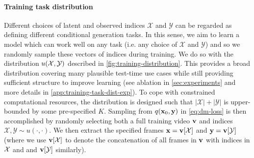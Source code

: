 \paragraph{Training task distribution}
Different choices of latent and observed indices $\mathcal{X}$ and $\mathcal{Y}$ can be regarded as defining different conditional generation tasks. In this sense, we aim to learn a model which can work well on any task (i.e. any choice of $\mathcal{X}$ and $\mathcal{Y}$) and so we randomly sample these vectors of indices during training. We do so with the distribution $u(\mathcal{X},\mathcal{Y})$ described in \cref{fig:training-distribution}. This provides a broad distribution covering many plausible test-time use cases while still providing sufficient structure to improve learning (see ablation in \cref{sec:experiments} and more details in \cref{app:training-task-dist-exp}). To cope with constrained computational resources, the distribution is designed such that $|\mathcal{X}|+|\mathcal{Y}|$ is upper-bounded by some pre-specified $K$. Sampling from $q({\mathbf{x}}_0, {\mathbf{y}})$ in \cref{eq:dm-loss} is then accomplished by randomly selecting both a full training video ${\mathbf{v}}$ and indices $\mathcal{X},\mathcal{Y}\sim u(\cdot,\cdot)$. We then extract the specified frames ${\mathbf{x}} = {\mathbf{v}}[\mathcal{X}]$ and ${\mathbf{y}} = {\mathbf{v}}[\mathcal{Y}]$ (where we use ${\mathbf{v}}[\mathcal{X}]$ to denote the concatenation of all frames in ${\mathbf{v}}$ with indices in $\mathcal{X}$ and and ${\mathbf{v}}[\mathcal{Y}]$ similarly).




